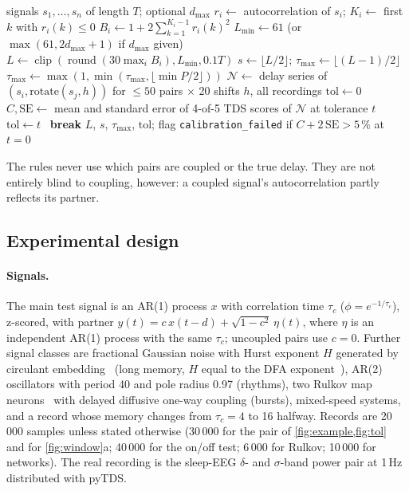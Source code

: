 \documentclass[11pt,a4paper]{article}
\begin{document}
\begin{algorithm}[t]
\caption{aTDS parameter selection (v2.1)}
\label{alg:atds}
\begin{algorithmic}[1]
\Require signals $s_1,\dots,s_n$ of length $T$; optional $d_{\max}$
  \State $r_i \gets$ autocorrelation of $s_i$; \quad $K_i \gets$ first $k$ with $r_i(k)\le 0$
  \State $B_i \gets 1 + 2\sum_{k=1}^{K_i-1} r_i(k)^2$
\EndFor
\State $L_{\min} \gets 61$ (or $\max(61, 2d_{\max}+1)$ if $d_{\max}$ given)
\State $L \gets \operatorname{clip}(\operatorname{round}(30\max_i B_i), L_{\min}, 0.1T)$ 
\State $s \gets \lfloor L/2\rfloor$; \quad $\tau_{\max} \gets \lfloor (L-1)/2 \rfloor$
 $\tau_{\max} \gets \max(1, \min(\tau_{\max}, \lfloor\min P/2\rfloor))$ \EndIf
\State $\mathcal{N} \gets$ delay series of $(s_i, \mathrm{rotate}(s_j, h))$ for $\le 50$ pairs $\times$ 20 shifts $h$, all recordings
\State $\mathrm{tol} \gets 0$
  \State $C, \mathrm{SE} \gets$ mean and standard error of 4-of-5 TDS scores of $\mathcal{N}$ at tolerance $t$
   $\mathrm{tol} \gets t$ \Else\ \textbf{break} \EndIf
\EndFor
\State \Return $L$, $s$, $\tau_{\max}$, $\mathrm{tol}$; flag \texttt{calibration\_failed} if $C + 2\,\mathrm{SE} > 5\,\%$ at $t=0$
\end{algorithmic}
\end{algorithm}

The rules never use which pairs are coupled or the true delay. They are not entirely blind to coupling, however: a coupled signal's autocorrelation partly reflects its partner.

\subsection{Experimental design}
\label{sec:design}
\paragraph{Signals.} The main test signal is an AR(1) process $x$ with correlation time $\tau_c$ ($\phi = e^{-1/\tau_c}$), z-scored, with partner $y(t) = c\, x(t-d) + \sqrt{1-c^2}\,\eta(t)$, where $\eta$ is an independent AR(1) process with the same $\tau_c$; uncoupled pairs use $c = 0$. Further signal classes are fractional Gaussian noise with Hurst exponent $H$ generated by circulant embedding~\cite{Davies1987TestsHurst} (long memory, $H$ equal to the DFA exponent~\cite{Peng1995QuantificationScaling}), AR(2) oscillators with period 40 and pole radius 0.97 (rhythms), two Rulkov map neurons~\cite{Rulkov2002ModelingSpikingbursting} with delayed diffusive one-way coupling (bursts), mixed-speed systems, and a record whose memory changes from $\tau_c = 4$ to 16 halfway. Records are 20\,000 samples unless stated otherwise (30\,000 for the pair of \cref{fig:example,fig:tol} and for \cref{fig:window}a; 40\,000 for the on/off test; 6\,000 for Rulkov; 10\,000 for networks). The real recording is the sleep-EEG $\delta$- and $\sigma$-band power pair at 1\,Hz distributed with pyTDS.
\end{document}
